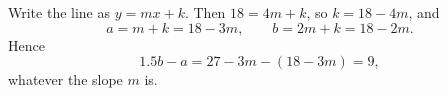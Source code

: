 Write the line as $y=mx+k$. Then $18=4m+k$, so $k=18-4m$, and
\[
a=m+k=18-3m,\qquad b=2m+k=18-2m .
\]
Hence
\[
1.5b-a=27-3m-(18-3m)=\boxed{9},
\]
whatever the slope $m$ is.
